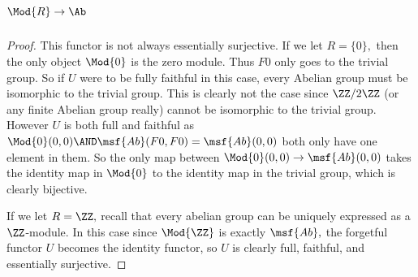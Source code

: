 \documentclass[main.tex]{subfiles}
\begin{document}
\subparagraph{\(\Mod{R}\to\Ab\)}
\begin{proof}
	This functor is not always essentially surjective. If we let $ R=\{0\}, $
	then the only object $ \Mod{0}$ is the zero module. Thus $ F0 $ only goes to
	the trivial group. So if $ U $ were to be fully faithful in this case, every
	Abelian group must be isomorphic to the trivial group. This is clearly not
	the case since $ \ZZ/2\ZZ $ (or any finite Abelian group really) cannot be
	isomorphic to the trivial group. However $ U $ is both full and faithful as
	$ \Mod{0}(0,0)\AND \msf{Ab}(F0,F0)=\msf{Ab}(0,0) $ both only have one
	element in them. So the only map between $ \Mod{0}(0,0)\to \msf{Ab}(0,0) $
	takes the identity map in $ \Mod{0} $ to the identity map in the trivial
	group, which is clearly bijective.

	If we let $ R=\ZZ,$ recall that every abelian group can be uniquely
	expressed as a $\ZZ$-module. In this case since $ \Mod{\ZZ} $ is exactly
	$ \msf{Ab},$ the forgetful functor $ U $ becomes the identity functor, so
	$ U $ is clearly full, faithful, and essentially surjective.


\end{proof}
\end{document}
